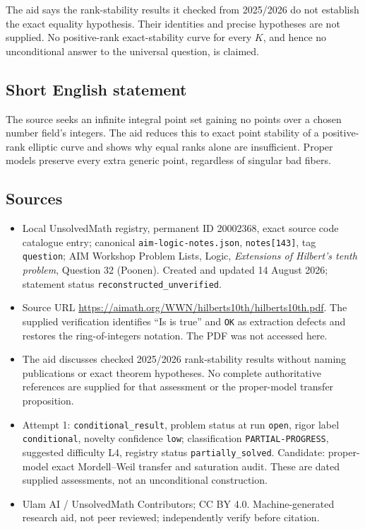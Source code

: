 \documentclass[11pt]{article}
\begin{document}
The aid says the rank-stability results it checked from 2025/2026 do not establish the exact equality hypothesis. Their identities and precise hypotheses are not supplied. No positive-rank exact-stability curve for every \(K\), and hence no unconditional answer to the universal question, is claimed.
\subsection{Short English statement}
The source seeks an infinite integral point set gaining no points over a chosen number field's integers. The aid reduces this to exact point stability of a positive-rank elliptic curve and shows why equal ranks alone are insufficient. Proper models preserve every extra generic point, regardless of singular bad fibers.
\subsection{Sources}
\begin{itemize}
\item Local UnsolvedMath registry, permanent ID 20002368, exact source code catalogue entry; canonical \texttt{aim-logic-notes.json}, \texttt{notes[143]}, tag \texttt{question}; AIM Workshop Problem Lists, Logic, \emph{Extensions of Hilbert's tenth problem}, Question 32 (Poonen). Created and updated 14 August 2026; statement status \texttt{reconstructed\_unverified}.
\item Source URL \url{https://aimath.org/WWN/hilberts10th/hilberts10th.pdf}. The supplied verification identifies ``Is is true'' and \texttt{OK} as extraction defects and restores the ring-of-integers notation. The PDF was not accessed here.
\item The aid discusses checked 2025/2026 rank-stability results without naming publications or exact theorem hypotheses. No complete authoritative references are supplied for that assessment or the proper-model transfer proposition.
\item Attempt 1: \texttt{conditional\_result}, problem status at run \texttt{open}, rigor label \texttt{conditional}, novelty confidence \texttt{low}; classification \texttt{PARTIAL-PROGRESS}, suggested difficulty L4, registry status \texttt{partially\_solved}. Candidate: proper-model exact Mordell--Weil transfer and saturation audit. These are dated supplied assessments, not an unconditional construction.
\item Ulam AI / UnsolvedMath Contributors; CC BY 4.0. Machine-generated research aid, not peer reviewed; independently verify before citation.
\end{itemize}
\end{document}
